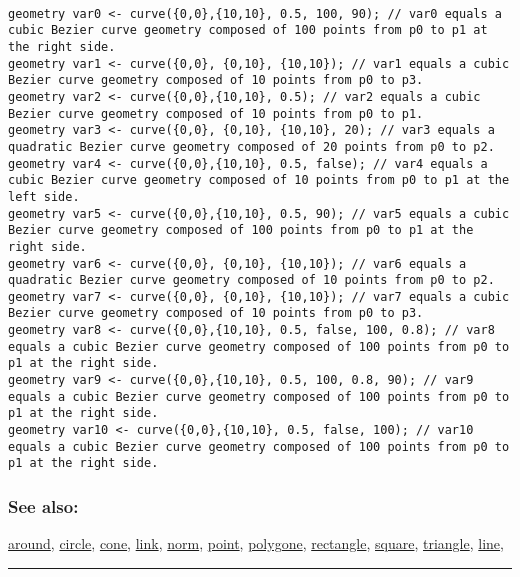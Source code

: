 \documentclass[]{book}
\theoremstyle{definition}
\theoremstyle{definition}
\theoremstyle{definition}
\theoremstyle{remark}
\begin{document}
\begin{verbatim}
 
geometry var0 <- curve({0,0},{10,10}, 0.5, 100, 90); // var0 equals a cubic Bezier curve geometry composed of 100 points from p0 to p1 at the right side. 
geometry var1 <- curve({0,0}, {0,10}, {10,10}); // var1 equals a cubic Bezier curve geometry composed of 10 points from p0 to p3. 
geometry var2 <- curve({0,0},{10,10}, 0.5); // var2 equals a cubic Bezier curve geometry composed of 10 points from p0 to p1. 
geometry var3 <- curve({0,0}, {0,10}, {10,10}, 20); // var3 equals a quadratic Bezier curve geometry composed of 20 points from p0 to p2. 
geometry var4 <- curve({0,0},{10,10}, 0.5, false); // var4 equals a cubic Bezier curve geometry composed of 10 points from p0 to p1 at the left side. 
geometry var5 <- curve({0,0},{10,10}, 0.5, 90); // var5 equals a cubic Bezier curve geometry composed of 100 points from p0 to p1 at the right side. 
geometry var6 <- curve({0,0}, {0,10}, {10,10}); // var6 equals a quadratic Bezier curve geometry composed of 10 points from p0 to p2. 
geometry var7 <- curve({0,0}, {0,10}, {10,10}); // var7 equals a cubic Bezier curve geometry composed of 10 points from p0 to p3. 
geometry var8 <- curve({0,0},{10,10}, 0.5, false, 100, 0.8); // var8 equals a cubic Bezier curve geometry composed of 100 points from p0 to p1 at the right side. 
geometry var9 <- curve({0,0},{10,10}, 0.5, 100, 0.8, 90); // var9 equals a cubic Bezier curve geometry composed of 100 points from p0 to p1 at the right side. 
geometry var10 <- curve({0,0},{10,10}, 0.5, false, 100); // var10 equals a cubic Bezier curve geometry composed of 100 points from p0 to p1 at the right side.
\end{verbatim}

\subsubsection{See also:}\label{see-also-74}

\href{OperatorsAA\#around}{around}, \href{OperatorsBC\#circle}{circle},
\href{OperatorsBC\#cone}{cone}, \href{OperatorsIM\#link}{link},
\href{OperatorsNR\#norm}{norm}, \href{OperatorsNR\#point}{point},
\href{OperatorsSZ\#polygone}{polygone},
\href{OperatorsNR\#rectangle}{rectangle},
\href{OperatorsSZ\#square}{square},
\href{OperatorsSZ\#triangle}{triangle}, \href{OperatorsIM\#line}{line},

\begin{center}\rule{0.5\linewidth}{\linethickness}\end{center}
\end{document}
